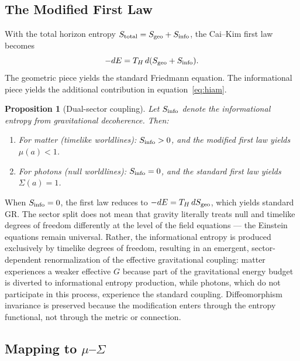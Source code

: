\documentclass[twocolumn,a4paper,aps,prd,twocolumn,showpacs,notitlepage,superscriptaddress,nofootinbib]{article}
\newtheorem{proposition}{Proposition}
\begin{document}
\subsection{The Modified First Law}

With the total horizon entropy $S_{\rm total} = S_{\rm geo} + S_{\rm info}$,
the Cai--Kim first law becomes
\begin{equation}
  -dE = T_H\,d(S_{\rm geo} + S_{\rm info}).
  \label{eq:modifiedfirstlaw}
\end{equation}
The geometric piece yields the standard Friedmann equation.  The informational
piece yields the additional contribution in equation~\eqref{eq:hiam}.

\begin{proposition}[Dual-sector coupling]
  Let $S_{\rm info}$ denote the informational entropy from gravitational
  decoherence.  Then:
  \begin{enumerate}
    \item For matter (timelike worldlines): $S_{\rm info} > 0$, and the
      modified first law yields $\mu(a) < 1$.
    \item For photons (null worldlines): $S_{\rm info} = 0$, and the standard
      first law yields $\Sigma(a) = 1$.
  \end{enumerate}
\end{proposition}

When $S_{\rm info} = 0$, the first law reduces to $-dE = T_H\,dS_{\rm geo}$,
which yields standard GR.  The sector split does not mean that gravity
literally treats null and timelike degrees of freedom differently at the level
of the field equations — the Einstein equations remain universal.  Rather, the
informational entropy is produced exclusively by timelike degrees of freedom,
resulting in an emergent, sector-dependent renormalization of the effective
gravitational coupling: matter experiences a weaker effective $G$ because part
of the gravitational energy budget is diverted to informational entropy
production, while photons, which do not participate in this process, experience
the standard coupling.  Diffeomorphism invariance is preserved because the
modification enters through the entropy functional, not through the metric or
connection.

\subsection{Mapping to $\mu$--$\Sigma$}
\end{document}
